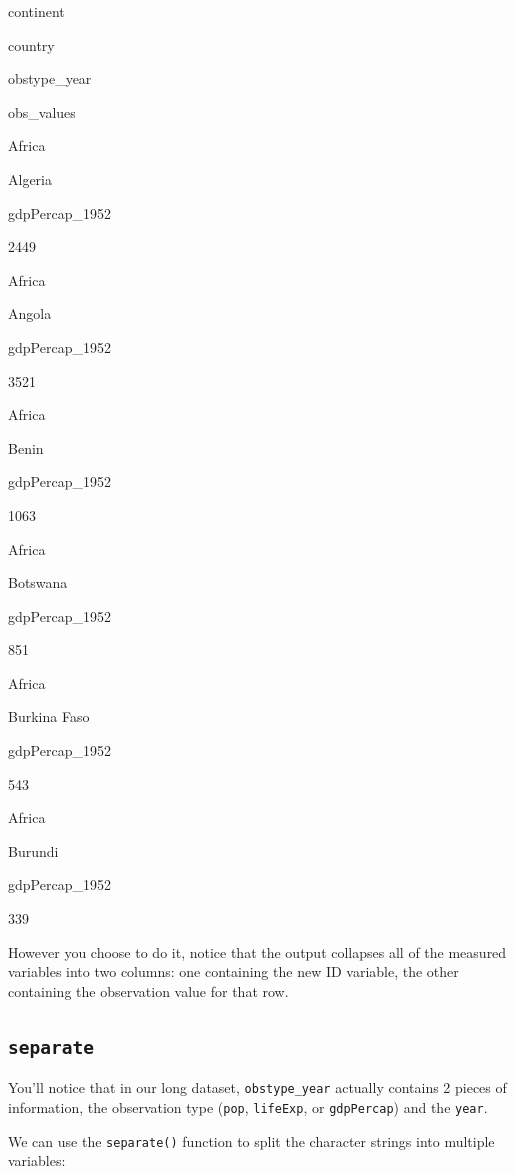 \documentclass[]{book}
\newenvironment{Shaded}{\begin{snugshade}}{\end{snugshade}}
\newcommand{\KeywordTok}[1]{\textcolor[rgb]{0.13,0.29,0.53}{\textbf{#1}}}
\newcommand{\DataTypeTok}[1]{\textcolor[rgb]{0.13,0.29,0.53}{#1}}
\newcommand{\StringTok}[1]{\textcolor[rgb]{0.31,0.60,0.02}{#1}}
\newcommand{\OperatorTok}[1]{\textcolor[rgb]{0.81,0.36,0.00}{\textbf{#1}}}
\newcommand{\NormalTok}[1]{#1}
\begin{document}
continent

country

obstype\_year

obs\_values

Africa

Algeria

gdpPercap\_1952

2449

Africa

Angola

gdpPercap\_1952

3521

Africa

Benin

gdpPercap\_1952

1063

Africa

Botswana

gdpPercap\_1952

851

Africa

Burkina Faso

gdpPercap\_1952

543

Africa

Burundi

gdpPercap\_1952

339

However you choose to do it, notice that the output collapses all of the
measured variables into two columns: one containing the new ID variable,
the other containing the observation value for that row.

\subsection{\texorpdfstring{\texttt{separate}}{separate}}\label{separate}

You'll notice that in our long dataset, \texttt{obstype\_year} actually
contains 2 pieces of information, the observation type (\texttt{pop},
\texttt{lifeExp}, or \texttt{gdpPercap}) and the \texttt{year}.

We can use the \texttt{separate()} function to split the character
strings into multiple variables:

\begin{Shaded}
\end{Shaded}
\end{document}
